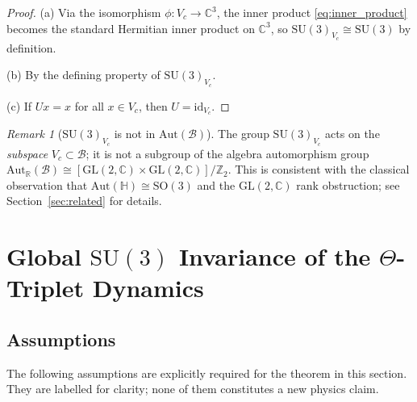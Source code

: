 \documentclass[12pt,a4paper]{article}
\theoremstyle{remark}
\newtheorem{remark}[theorem]{Remark}
\newcommand{\B}{\mathcal{B}}          %
\newcommand{\C}{\mathbb{C}}
\newcommand{\R}{\mathbb{R}}
\newcommand{\H}{\mathbb{H}}
\begin{document}
\begin{proof}
  (a) Via the isomorphism $\phi:V_c\to\C^3$, the inner product
  \eqref{eq:inner_product} becomes the standard Hermitian inner product on
  $\C^3$, so $\mathrm{SU}(3)_{V_c}\cong\mathrm{SU}(3)$ by definition.

  (b) By the defining property of $\mathrm{SU}(3)_{V_c}$.

  (c) If $Ux=x$ for all $x\in V_c$, then $U=\mathrm{id}_{V_c}$.
\end{proof}

\begin{remark}[$\mathrm{SU}(3)_{V_c}$ is not in $\mathrm{Aut}(\B)$]
  \label{rem:not_aut}
  The group $\mathrm{SU}(3)_{V_c}$ acts on the \emph{subspace} $V_c\subset\B$;
  it is not a subgroup of the algebra automorphism group
  $\mathrm{Aut}_\R(\B)\cong[\mathrm{GL}(2,\C)\times\mathrm{GL}(2,\C)]/\mathbb{Z}_2$.
  This is consistent with the classical observation that
  $\mathrm{Aut}(\H)\cong\mathrm{SO}(3)$ and the $\mathrm{GL}(2,\C)$ rank
  obstruction; see Section~\ref{sec:related} for details.
\end{remark}

\section{Global $\mathrm{SU}(3)$ Invariance of the $\Theta$-Triplet Dynamics}
\label{sec:global_invariance}

\subsection{Assumptions}
\label{subsec:global_assumptions}

The following assumptions are explicitly required for the theorem in this
section.  They are labelled for clarity; none of them constitutes a new
physics claim.
\end{document}
